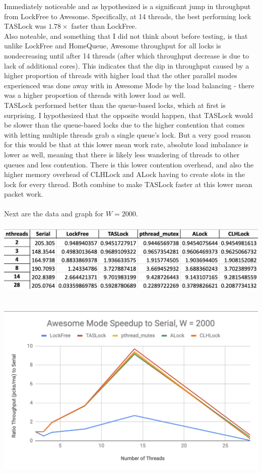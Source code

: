 \documentclass{article}
\begin{document}
\begin{adjustwidth}{-2cm}{-2cm}
Immediately noticeable and as hypothesized is a significant jump in throughput from LockFree to Awesome. Specifically, at 14 threads, the best performing lock TASLock was $1.78\times$ faster than LockFree.\\
Also noteable, and something that I did not think about before testing, is that unlike LockFree and HomeQueue, Awesome throughput for all locks is nondecreasing until after 14 threads (after which throughput decrease is due to lack of additional cores). This indicates that the dip in throughput caused by a higher proportion of threads with higher load that the other parallel modes experienced was done away with in Awesome Mode by the load balancing - there was a higher proportion of threads with lower load as well.\\
TASLock performed better than the queue-based locks, which at first is surprising. I hypothesized that the opposite would happen, that TASLock would be slower than the queue-based locks due to the higher contention that comes with letting multiple threads grab a single queue's lock. But a very good reason for this would be that at this lower mean work rate, absolute load imbalance is lower as well, meaning that there is likely less wandering of threads to other queues and less contention. There is this lower contention overhead, and also the higher memory overhead of CLHLock and ALock having to create slots in the lock for every thread. Both combine to make TASLock faster at this lower mean packet work.\\
\null\\Next are the data and graph for $W=2000$.\\
\null\\
\includegraphics[width=\linewidth]{b_awe2000Data.png}\\ \null\\
\null\\
\includegraphics[width=\linewidth]{b_awe2000Graph.png}\\ \null\\

\end{adjustwidth}
\end{document}
